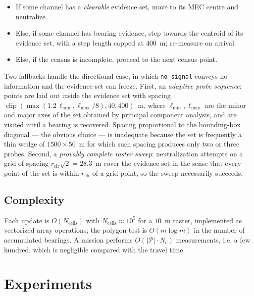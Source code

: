 \documentclass[journal,10pt]{IEEEtran}
\theoremstyle{definition}
\newcommand{\bP}{\mathcal{P}}
\begin{document}
\begin{itemize}
\item If some channel has a \emph{clearable} evidence set, move to its MEC centre and neutralize.
\item Else, if some channel has bearing evidence, step towards the centroid of its evidence set,
with a step length capped at $400$~m; re-measure on arrival.
\item Else, if the census is incomplete, proceed to the next census point.
\end{itemize}

Two fallbacks handle the directional case, in which \texttt{no\_signal} conveys no information and
the evidence set can freeze. First, an \emph{adaptive probe sequence}: points are laid out inside
the evidence set with spacing $\operatorname{clip}(\max(1.2\,\ell_{\min},\ell_{\max}/8),40,400)$~m,
where $\ell_{\min},\ell_{\max}$ are the minor and major axes of the set obtained by principal
component analysis, and are visited until a bearing is recovered. Spacing proportional to the
bounding-box diagonal --- the obvious choice --- is inadequate because the set is frequently a thin
wedge of $1500\times50$~m for which such spacing produces only two or three probes. Second, a
\emph{provably complete raster sweep}: neutralization attempts on a grid of spacing
$r_{\mathrm{clr}}\sqrt2=28.3$~m cover the evidence set in the sense that every point of the set is
within $r_{\mathrm{clr}}$ of a grid point, so the sweep necessarily succeeds.

\subsection{Complexity}
Each update is $O(N_{\mathrm{cells}})$ with $N_{\mathrm{cells}}\approx10^5$ for a $10$~m raster,
implemented as vectorized array operations; the polygon test is $O(m\log m)$ in the number of
accumulated bearings. A mission performs $O(|\bP|\cdot N_c)$ measurements, i.e. a few hundred,
which is negligible compared with the travel time.

\section{Experiments}
\label{sec:experiments}
\end{document}
